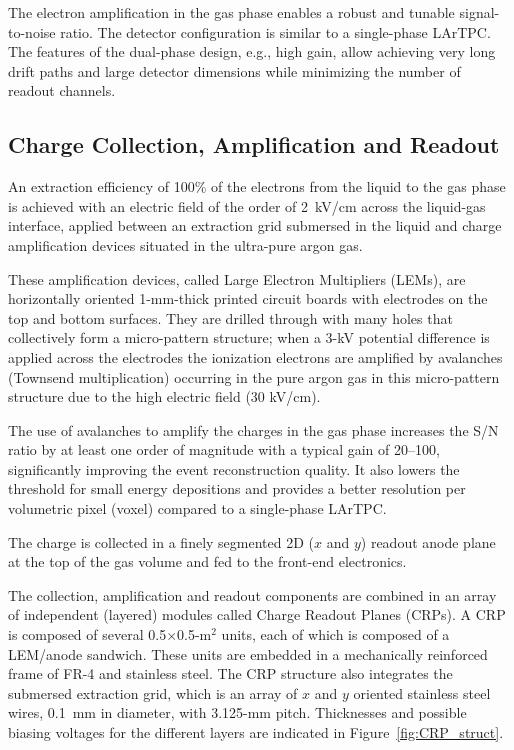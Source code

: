 The electron amplification in the gas phase enables a robust and tunable signal-to-noise ratio. 
The detector configuration is similar to a single-phase LArTPC. The features of the dual-phase design, e.g., high gain, 
allow achieving very long drift paths and large detector dimensions while minimizing the number of readout channels.

\subsection{Charge Collection, Amplification and Readout}

An extraction efficiency of 100\% of the electrons from the liquid to
the gas phase is achieved with an electric field of the order of
2~kV/cm across the liquid-gas interface, applied between an 
extraction grid submersed in the liquid and charge amplification 
devices situated in the ultra-pure argon gas. 

These amplification devices, called Large Electron Multipliers (LEMs), are horizontally 
oriented 1-mm-thick printed 
circuit boards with electrodes on the top and bottom surfaces. They are drilled
through with many holes that collectively form a micro-pattern structure;  
when a 3-kV potential difference is applied across the electrodes
the ionization electrons are amplified by avalanches (Townsend multiplication) occurring in the 
pure argon gas in this micro-pattern structure\cite{Bondar:2008yw} due to the high electric field (30 kV/cm).

The use of avalanches to amplify the charges in the gas phase increases
the S/N ratio by at least one order of magnitude with a typical gain of 20--100, significantly
improving the event reconstruction quality. It also lowers the
threshold for small energy depositions and provides a better
resolution per volumetric pixel (voxel) compared to a single-phase
LArTPC. 

The charge is collected in a finely segmented 2D ($x$ and $y$) readout anode
plane at the top of the gas volume and fed to the front-end electronics.   

The  collection, amplification and readout components are combined in an array of 
independent (layered) modules called Charge Readout Planes (CRPs). A CRP is 
composed of several 0.5$\times$0.5-m$^2$ units, each of which is composed 
of a LEM/anode sandwich. 
These units are embedded in a mechanically reinforced frame of FR-4 and stainless steel. The CRP structure also integrates
 the submersed extraction grid, which is an array of $x$ and $y$ oriented stainless steel wires, 0.1~mm in diameter, with 3.125-mm
pitch. Thicknesses and possible biasing voltages for the different layers are indicated in Figure~\ref{fig:CRP_struct}.

